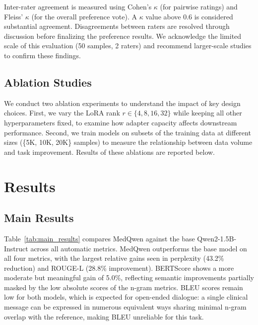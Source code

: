 \documentclass[12pt,a4paper]{article}
\begin{document}
Inter-rater agreement is measured using Cohen's $\kappa$ (for pairwise ratings) and Fleiss' $\kappa$ (for the overall preference vote). A $\kappa$ value above 0.6 is considered substantial agreement. Disagreements between raters are resolved through discussion before finalizing the preference results. We acknowledge the limited scale of this evaluation (50 samples, 2 raters) and recommend larger-scale studies to confirm these findings.

\subsection{Ablation Studies}

We conduct two ablation experiments to understand the impact of key design choices. First, we vary the LoRA rank $r \in \{4, 8, 16, 32\}$ while keeping all other hyperparameters fixed, to examine how adapter capacity affects downstream performance. Second, we train models on subsets of the training data at different sizes (\{5K, 10K, 20K\} samples) to measure the relationship between data volume and task improvement. Results of these ablations are reported below.

\section{Results}
\label{sec:results}

\subsection{Main Results}

Table~\ref{tab:main_results} compares MedQwen against the base Qwen2-1.5B-Instruct across all automatic metrics. MedQwen outperforms the base model on all four metrics, with the largest relative gains seen in perplexity (43.2\% reduction) and ROUGE-L (28.8\% improvement). BERTScore shows a more moderate but meaningful gain of 5.0\%, reflecting semantic improvements partially masked by the low absolute scores of the n-gram metrics. BLEU scores remain low for both models, which is expected for open-ended dialogue: a single clinical message can be expressed in numerous equivalent ways sharing minimal n-gram overlap with the reference, making BLEU unreliable for this task.
\end{document}
